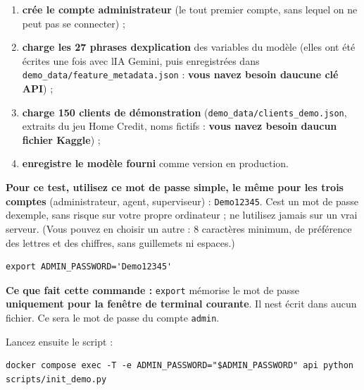\documentclass[
  french,
  11pt,
  a4paper,
]{article}
\providecommand{\tightlist}{%
  \setlength{\itemsep}{0pt}\setlength{\parskip}{0pt}}
\begin{document}
\begin{enumerate}
\def\labelenumi{\arabic{enumi}.}
\tightlist
\item
  \textbf{crée le compte administrateur} (le tout premier compte, sans
  lequel on ne peut pas se connecter) ;
\item
  \textbf{charge les 27 phrases d\textquotesingle explication} des
  variables du modèle (elles ont été écrites une fois avec
  l\textquotesingle IA Gemini, puis enregistrées dans
  \texttt{demo\_\allowbreak{}data/\allowbreak{}feature\_\allowbreak{}metadata.\allowbreak{}json}
  : \textbf{vous n\textquotesingle avez besoin d\textquotesingle aucune
  clé API}) ;
\item
  \textbf{charge 150 clients de démonstration}
  (\texttt{demo\_\allowbreak{}data/\allowbreak{}clients\_\allowbreak{}demo.\allowbreak{}json},
  extraits du jeu Home Credit, noms fictifs : \textbf{vous
  n\textquotesingle avez besoin d\textquotesingle aucun fichier Kaggle})
  ;
\item
  \textbf{enregistre le modèle fourni} comme version en production.
\end{enumerate}

\textbf{Pour ce test, utilisez ce mot de passe simple, le même pour les
trois comptes} (administrateur, agent, superviseur) :
\texttt{Demo12345}. C\textquotesingle est un mot de passe
d\textquotesingle exemple, sans risque sur votre propre ordinateur ; ne
l\textquotesingle utilisez jamais sur un vrai serveur. (Vous pouvez en
choisir un autre : 8 caractères minimum, de préférence des lettres et
des chiffres, sans guillemets ni espaces.)

\begin{Verbatim}[breaklines=true,breakanywhere=true,fontsize=\small,frame=leftline,framerule=1.6pt,rulecolor=\color{credixblue},framesep=3mm,xleftmargin=2mm,xrightmargin=1mm]
export ADMIN_PASSWORD='Demo12345'
\end{Verbatim}

\textbf{Ce que fait cette commande :} \texttt{export} mémorise le mot de
passe \textbf{uniquement pour la fenêtre de terminal courante}. Il
n\textquotesingle est écrit dans aucun fichier. Ce sera le mot de passe
du compte \texttt{admin}.

Lancez ensuite le script :

\begin{Verbatim}[breaklines=true,breakanywhere=true,fontsize=\small,frame=leftline,framerule=1.6pt,rulecolor=\color{credixblue},framesep=3mm,xleftmargin=2mm,xrightmargin=1mm]
docker compose exec -T -e ADMIN_PASSWORD="$ADMIN_PASSWORD" api python scripts/init_demo.py
\end{Verbatim}
\end{document}
